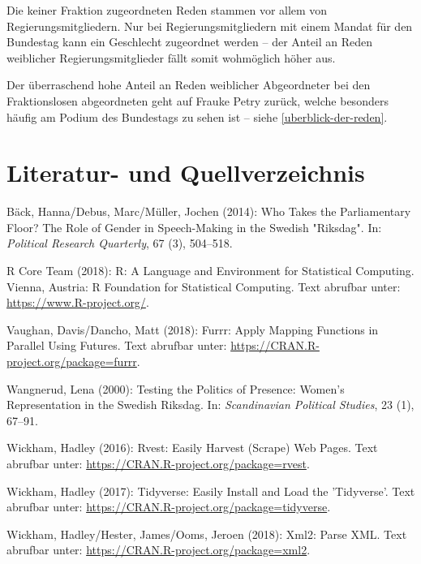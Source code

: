 \documentclass[oneside, 12pt, numbers=endperiod]{scrbook}
\theoremstyle{definition}
\theoremstyle{definition}
\theoremstyle{definition}
\theoremstyle{remark}
\begin{document}
Die keiner Fraktion zugeordneten Reden stammen vor allem von
Regierungsmitgliedern. Nur bei Regierungsmitgliedern mit einem Mandat
für den Bundestag kann ein Geschlecht zugeordnet werden -- der Anteil an
Reden weiblicher Regierungsmitglieder fällt somit wohmöglich höher aus.

Der überraschend hohe Anteil an Reden weiblicher Abgeordneter bei den
Fraktionslosen abgeordneten geht auf Frauke Petry zurück, welche
besonders häufig am Podium des Bundestags zu sehen ist -- siehe
\ref{uberblick-der-reden}.

\hypertarget{literatur--und-quellverzeichnis}{%
\chapter*{Literatur- und
Quellverzeichnis}\label{literatur--und-quellverzeichnis}}

\hypertarget{refs}{}
\leavevmode\hypertarget{ref-back_2014}{}%
Bäck, Hanna/Debus, Marc/Müller, Jochen (2014): Who Takes the
Parliamentary Floor? The Role of Gender in Speech-Making in the Swedish
"Riksdag". In: \emph{Political Research Quarterly}, 67 (3), 504--518.

\leavevmode\hypertarget{ref-rcoreteam_2018}{}%
R Core Team (2018): R: A Language and Environment for Statistical
Computing. Vienna, Austria: R Foundation for Statistical Computing. Text
abrufbar unter: \url{https://www.R-project.org/}.

\leavevmode\hypertarget{ref-vaughan_2018}{}%
Vaughan, Davis/Dancho, Matt (2018): Furrr: Apply Mapping Functions in
Parallel Using Futures. Text abrufbar unter:
\url{https://CRAN.R-project.org/package=furrr}.

\leavevmode\hypertarget{ref-wangnerud_2000}{}%
Wangnerud, Lena (2000): Testing the Politics of Presence: Women's
Representation in the Swedish Riksdag. In: \emph{Scandinavian Political
Studies}, 23 (1), 67--91.

\leavevmode\hypertarget{ref-wickham_2016}{}%
Wickham, Hadley (2016): Rvest: Easily Harvest (Scrape) Web Pages. Text
abrufbar unter: \url{https://CRAN.R-project.org/package=rvest}.

\leavevmode\hypertarget{ref-wickham_2017}{}%
Wickham, Hadley (2017): Tidyverse: Easily Install and Load the
'Tidyverse'. Text abrufbar unter:
\url{https://CRAN.R-project.org/package=tidyverse}.

\leavevmode\hypertarget{ref-wickham_2018}{}%
Wickham, Hadley/Hester, James/Ooms, Jeroen (2018): Xml2: Parse XML. Text
abrufbar unter: \url{https://CRAN.R-project.org/package=xml2}.
\end{document}
